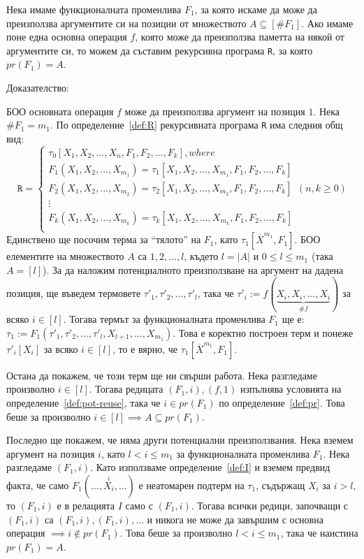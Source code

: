 \documentclass[12pt,twoside,a4paper]{article}
\begin{document}
	\begin{statement}\label{stmnt:gen-pr} Нека имаме функционалната променлива $F_1$, за която искаме да може да преизползва аргументите си на позиции от множеството $A \subseteq [\#F_1]$. Ако имаме поне една основна операция $f$, която може да преизползва паметта на някой от аргументите си, то можем да съставим рекурсивна програма \texttt{R}, за която $pr(F_1) = A$.
		
		\noindent Доказателство:
		
		БОО основната операция $f$ може да преизползва аргумент на позиция $1$. Нека $\#F_1=m_1$. По определение~\ref{def:R} рекурсивната програма \texttt{R} има следния общ вид:
		\begin{equation*}
			\texttt{R} =
			\begin{cases}
				\tau_0[X_1, X_2, \dots, X_n, F_1, F_2, \dots, F_k], where\\
				F_1(X_1, X_2, \dots, X_{m_1})=\tau_1[X_1, X_2, \dots, X_{m_1}, F_1, F_2, \dots, F_k]\\
				F_2(X_1, X_2, \dots, X_{m_2})=\tau_2[X_1, X_2, \dots, X_{m_2}, F_1, F_2, \dots, F_k]\\
				\vdots\\
				F_k(X_1, X_2, \dots, X_{m_k})=\tau_k[X_1, X_2, \dots, X_{m_k}, F_1, F_2, \dots, F_k]\\
			\end{cases}
			(n, k \ge 0)
		\end{equation*}
		Единствено ще посочим терма за "`тялото"' на $F_1$, като $\tau_1[\overline{X}^{m_1}, F_1]$. БОО елементите на множеството $A$ са $1, 2, \dots, l$, където $l = |A|$ и $0 \le l \le m_1$ (така $A = [l]$). За да наложим потенциалното преизползване на аргумент на дадена позиция, ще въведем термовете $\tau'_1, \tau'_2, \dots, \tau'_l$, така че $\tau'_i := f(\underbrace{X_i, X_i, \dots, X_i}_{\#f})$ за всяко $i \in [l]$. Тогава термът за функционалната променлива $F_1$ ще е: $\tau_1 := F_1(\tau'_1, \tau'_2, \dots, \tau'_l, X_{l+1}, \dots, X_{m_1})$. Това е коректно построен терм и понеже $\tau'_i[X_i]$ за всяко $i \in [l]$, то е вярно, че $\tau_1[\overline{X}^{m_1}, F_1]$.
		
		Остана да покажем, че този терм ще ни свърши работа. Нека разгледаме произволно $i \in [l]$. Тогава редицата $(F_1, i), (f, 1)$ изпълнява условията на определение~\ref{def:pot-reuse}, така че $i \in pr(F_1)$ по определение~\ref{def:pr}. Това беше за произволно $i \in [l] \implies A \subseteq pr(F_1)$.
		
		Последно ще покажем, че няма други потенциални преизползвания. Нека вземем аргумент на позиция $i$, като $l < i \le m_1$ за функционалната променлива $F_1$. Нека разгледаме $(F_1, i)$. Като използваме определение~\ref{def:I} и вземем предвид факта, че само $F_1(\dots,\overset{i}{X_i},\dots)$ е неатомарен подтерм на $\tau_1$, съдържащ $X_i$ за $i > l$, то $(F_1, i)$ е в релацията $I$ само с $(F_1,i)$. Тогава всички редици, започващи с $(F_1, i)$ са $(F_1, i), (F_1, i), \dots$ и никога не може да завършим с основна операция $\implies i \notin pr(F_1)$. Това беше за произволно $l < i \le m_1$, така че наистина $pr(F_1) = A$.
		

\end{statement}
\end{document}
